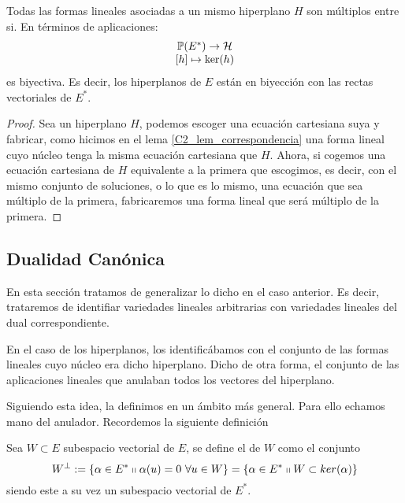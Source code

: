 \begin{lem}
	Todas las formas lineales asociadas a un mismo hiperplano $H$ son múltiplos entre si. En términos de aplicaciones:
	\[\begin{array}{c}
	\mathbb{P}(E^*)\to\mathcal{H}\\
	\left [ h \right ]\mapsto \ker(h)
	\end{array}
	\]
	es biyectiva. Es decir, los hiperplanos de $E$ están en biyección con las rectas vectoriales de $E^*$.
\end{lem}
\begin{proof}
	Sea un hiperplano $H$, podemos escoger una ecuación cartesiana suya y fabricar, como hicimos en el lema \ref{C2_lem_correspondencia} una forma lineal cuyo núcleo tenga la misma ecuación cartesiana que $H$. Ahora, si cogemos una ecuación cartesiana de $H$ equivalente a la primera que escogimos, es decir, con el mismo conjunto de soluciones, o lo que es lo mismo, una ecuación que sea múltiplo de la primera, fabricaremos una forma lineal que será múltiplo de la primera.
\end{proof}

\subsection{Dualidad Canónica}
En esta sección tratamos de generalizar lo dicho en el caso anterior. Es decir, trataremos de identifiar variedades lineales arbitrarias con variedades lineales del dual correspondiente.

En el caso de los hiperplanos, los identificábamos con el conjunto de las formas lineales cuyo núcleo era dicho hiperplano. Dicho de otra forma, el conjunto de las aplicaciones lineales que anulaban todos los vectores del hiperplano.

Siguiendo esta idea, la definimos en un ámbito más general. Para ello echamos mano del anulador. Recordemos la siguiente definición
\begin{defi}
	Sea $W\subset E$ subespacio vectorial de $E$, se define el  de $W$ como el conjunto
	\begin{equation}
	W^{\perp}:=\{\alpha\in E^*\shortparallel \alpha(u)=0 \ \forall u\in W\}=\{\alpha\in E^*\shortparallel W\subset ker(\alpha)\}
	\end{equation}
	siendo este a su vez un subespacio vectorial de $E^*$.
\end{defi}

